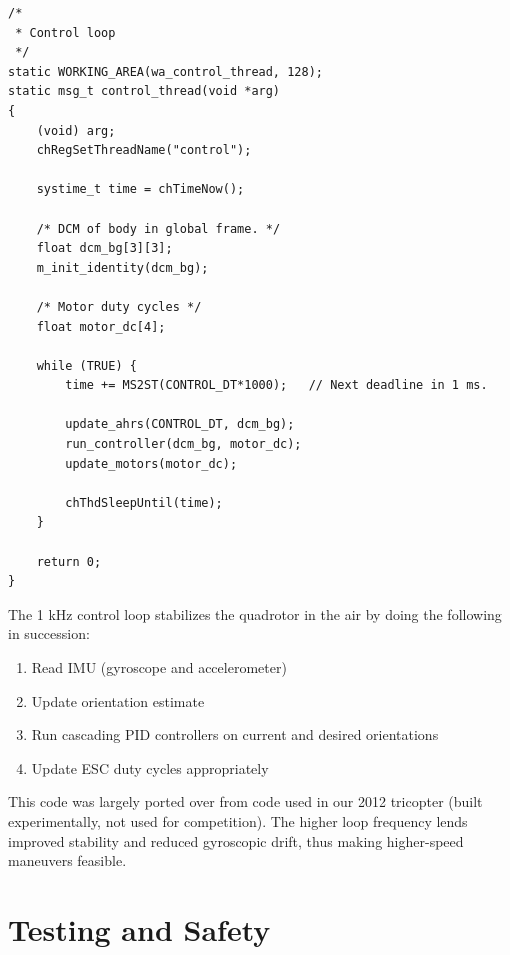 \documentclass[12pt,letterpaper]{article} \usepackage[margin=1in]{geometry}
\begin{document}
\begin{center} \begin{minipage}{5.5in}

{\scriptsize

\begin{verbatim}
/*
 * Control loop
 */
static WORKING_AREA(wa_control_thread, 128);
static msg_t control_thread(void *arg)
{
    (void) arg;
    chRegSetThreadName("control");

    systime_t time = chTimeNow();

    /* DCM of body in global frame. */
    float dcm_bg[3][3];
    m_init_identity(dcm_bg);

    /* Motor duty cycles */
    float motor_dc[4];

    while (TRUE) {
        time += MS2ST(CONTROL_DT*1000);   // Next deadline in 1 ms.

        update_ahrs(CONTROL_DT, dcm_bg);
        run_controller(dcm_bg, motor_dc);
        update_motors(motor_dc);

        chThdSleepUntil(time);
    }

    return 0;
}
\end{verbatim}

}

\end{minipage} \end{center}

The 1 kHz control loop stabilizes the quadrotor in the air by doing the
following in succession:

\begin{enumerate}
	\item Read IMU (gyroscope and accelerometer)
	\item Update orientation estimate
	\item Run cascading PID controllers on current and desired orientations
	\item Update ESC duty cycles appropriately
\end{enumerate}

This code was largely ported over from code used in our 2012 tricopter (built
experimentally, not used for competition). The higher loop frequency lends
improved stability and reduced gyroscopic drift, thus making higher-speed
maneuvers feasible.


\section*{Testing and Safety}
\end{document}
